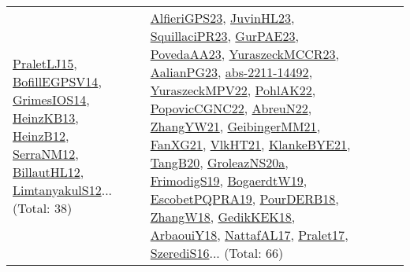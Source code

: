 {\begin{longtable}{lp{3cm}>{\raggedright}p{6cm}>{\raggedright}p{6cm}p{8cm}}
\href{papers/PraletLJ15.pdf}{PraletLJ15}\cite{PraletLJ15}, \href{papers/BofillEGPSV14.pdf}{BofillEGPSV14}\cite{BofillEGPSV14}, \href{articles/GrimesIOS14.pdf}{GrimesIOS14}\cite{GrimesIOS14}, \href{papers/HeinzKB13.pdf}{HeinzKB13}\cite{HeinzKB13}, \href{papers/HeinzB12.pdf}{HeinzB12}\cite{HeinzB12}, \href{papers/SerraNM12.pdf}{SerraNM12}\cite{SerraNM12}, \href{papers/BillautHL12.pdf}{BillautHL12}\cite{BillautHL12}, \href{articles/LimtanyakulS12.pdf}{LimtanyakulS12}\cite{LimtanyakulS12}... (Total: 38) & \href{articles/AlfieriGPS23.pdf}{AlfieriGPS23}\cite{AlfieriGPS23}, \href{papers/JuvinHL23.pdf}{JuvinHL23}\cite{JuvinHL23}, \href{papers/SquillaciPR23.pdf}{SquillaciPR23}\cite{SquillaciPR23}, \href{articles/GurPAE23.pdf}{GurPAE23}\cite{GurPAE23}, \href{papers/PovedaAA23.pdf}{PovedaAA23}\cite{PovedaAA23}, \href{articles/YuraszeckMCCR23.pdf}{YuraszeckMCCR23}\cite{YuraszeckMCCR23}, \href{papers/AalianPG23.pdf}{AalianPG23}\cite{AalianPG23}, \href{articles/abs-2211-14492.pdf}{abs-2211-14492}\cite{abs-2211-14492}, \href{articles/YuraszeckMPV22.pdf}{YuraszeckMPV22}\cite{YuraszeckMPV22}, \href{articles/PohlAK22.pdf}{PohlAK22}\cite{PohlAK22}, \href{papers/PopovicCGNC22.pdf}{PopovicCGNC22}\cite{PopovicCGNC22}, \href{articles/AbreuN22.pdf}{AbreuN22}\cite{AbreuN22}, \href{articles/ZhangYW21.pdf}{ZhangYW21}\cite{ZhangYW21}, \href{papers/GeibingerMM21.pdf}{GeibingerMM21}\cite{GeibingerMM21}, \href{articles/FanXG21.pdf}{FanXG21}\cite{FanXG21}, \href{articles/VlkHT21.pdf}{VlkHT21}\cite{VlkHT21}, \href{papers/KlankeBYE21.pdf}{KlankeBYE21}\cite{KlankeBYE21}, \href{papers/TangB20.pdf}{TangB20}\cite{TangB20}, \href{papers/GroleazNS20a.pdf}{GroleazNS20a}\cite{GroleazNS20a}, \href{papers/FrimodigS19.pdf}{FrimodigS19}\cite{FrimodigS19}, \href{papers/BogaerdtW19.pdf}{BogaerdtW19}\cite{BogaerdtW19}, \href{articles/EscobetPQPRA19.pdf}{EscobetPQPRA19}\cite{EscobetPQPRA19}, \href{articles/PourDERB18.pdf}{PourDERB18}\cite{PourDERB18}, \href{articles/ZhangW18.pdf}{ZhangW18}\cite{ZhangW18}, \href{articles/GedikKEK18.pdf}{GedikKEK18}\cite{GedikKEK18}, \href{papers/ArbaouiY18.pdf}{ArbaouiY18}\cite{ArbaouiY18}, \href{articles/NattafAL17.pdf}{NattafAL17}\cite{NattafAL17}, \href{papers/Pralet17.pdf}{Pralet17}\cite{Pralet17}, \href{papers/SzerediS16.pdf}{SzerediS16}\cite{SzerediS16}... (Total: 66)\\

\end{longtable}}
